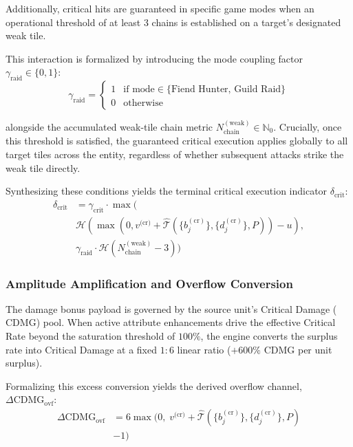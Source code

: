 \documentclass[twocolumn,10pt]{article}
\begin{document}
Additionally, critical hits are guaranteed in specific game modes when an operational threshold of at least 3 chains is established on a target's designated weak tile.

This interaction is formalized by introducing the mode coupling factor $\gamma_{\text{raid}} \in \{0, 1\}$:
\begin{equation}
\label{eq:mode_coupling}
  \gamma_{\text{raid}} = 
  \begin{cases} 
    1 & \text{if mode} \in {\{\text{Fiend Hunter, Guild Raid}\}} \\ 
    0 & \text{otherwise} 
  \end{cases}
\end{equation}

alongside the accumulated weak-tile chain metric $N_{\text{chain}}^{(\text{weak})} \in \mathbb{N}_0$. Crucially, once this threshold is satisfied, the guaranteed critical execution applies globally to all target tiles across the entity, regardless of whether subsequent attacks strike the weak tile directly.

Synthesizing these conditions yields the terminal critical execution indicator $\delta_{\text{crit}}$:
\begin{equation}
  \label{eq:crit_rate_dmgtype}
  \begin{aligned}
\delta_{\text{crit}} &= \gamma_{\text{crit}} \cdot \max \Big(\\
& \mathcal{H}\left(\max\left(0,v^{\text{(cr)}}+\hat{\mathcal{T}}\left(\{b^{(\text{cr})}_j\}, \{d^{(\text{cr})}_j\}, P\right)\right) - u\right), \\
& \gamma_{\text{raid}} \cdot \mathcal{H}\left(N^{(\text{weak})}_{\text{chain}} - 3\right)\Big)
  \end{aligned}
\end{equation}

\subsubsection{Amplitude Amplification and Overflow Conversion}

The damage bonus payload is governed by the source unit's Critical Damage ($\text{CDMG}$) pool. When active attribute enhancements drive the effective Critical Rate beyond the saturation threshold of $100\%$, the engine converts the surplus rate into Critical Damage at a fixed $1:6$ linear ratio ($+600\%$ $\text{CDMG}$ per unit surplus).

Formalizing this excess conversion yields the derived overflow channel, $\Delta \text{CDMG}_{\text{ovf}}$:
\begin{equation}
\label{eq:cdmg_overflow}
\begin{aligned}
  \Delta \text{CDMG}_{\text{ovf}} {}& = 6 \max\Big(0, \; v^{\text{(cr)}}+\hat{\mathcal{T}}\left(\{b^{(\text{cr})}_j\}, \{d^{(\text{cr})}_j\}, P\right) \\
  &- 1\Big)
\end{aligned}
\end{equation}
\end{document}
